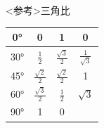 \documentclass[11pt,twoside]{article}
\begin{document}
\begin{minipage}[t]{0.52\linewidth}
\begin{itembox}[l]{<参考>三角比}
\begin{minipage}[t]{0.6\linewidth}
\begin{tabular}{|c|c|c|c|}
						0° & 0 & 1 & 0 \\\hline
						30° & $\frac{1}{2}$ & $\frac{\sqrt{3}}{2}$ & $\frac{1}{\sqrt{3}}$ \\\hline
						45° & $\frac{\sqrt{2}}{2}$ & $\frac{\sqrt{2}}{2}$ & 1 \\\hline
						60° & $\frac{\sqrt{3}}{2}$ & $\frac{1}{2}$ & $\sqrt{3}$ \\\hline
						90° & 1 & 0 &  \\\hline
					\end{tabular}
					　\\\\\\
				\end{minipage}
			\end{itembox}
		\end{minipage}
	\clearpage

\end{document}
